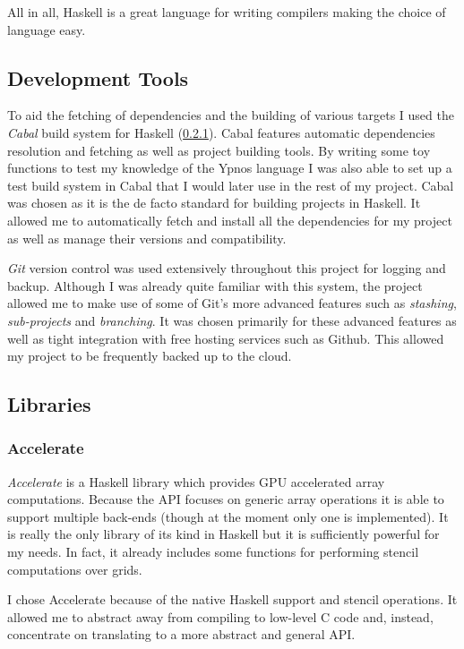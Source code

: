 \documentclass[12pt,a4paper,twoside]{scrbook}
\begin{document}
All in all, Haskell is a great language for writing compilers making the choice
of language easy.

\subsection{Development Tools}

To aid the fetching of dependencies and the building of various targets I
used the \emph{Cabal} build system for Haskell (\ref{}). Cabal features
automatic dependencies resolution and fetching as well as project building
tools. By writing some toy functions to test my knowledge of the Ypnos language
I was also able to set up a test build system in Cabal that I would later use in
the rest of my project. Cabal was chosen as it is the de facto standard for
building projects in Haskell. It allowed me to automatically fetch and install
all the dependencies for my project as well as manage their versions and
compatibility.

\emph{Git} version control was used extensively throughout this project for
logging and backup. Although I was already quite familiar with this system, the
project allowed me to make use of some of Git's more advanced features such as
\emph{stashing}, \emph{sub-projects} and \emph{branching}. It was chosen
primarily for these advanced features as well as tight integration with free
hosting services such as Github. This allowed my project to be frequently backed
up to the cloud.

\subsection{Libraries}

\subsubsection{Accelerate}

\emph{Accelerate} is a Haskell library which provides GPU accelerated array
computations. Because the API focuses on generic array operations it is able to
support multiple back-ends (though at the moment only one is implemented). It is
really the only library of its kind in Haskell but it is sufficiently powerful
for my needs. In fact, it already includes some functions for performing stencil
computations over grids.

I chose Accelerate because of the native Haskell support and stencil
operations. It allowed me to abstract away from compiling to low-level C code
and, instead, concentrate on translating to a more abstract and general API.
\end{document}
